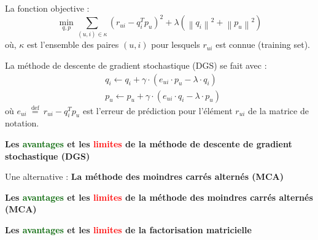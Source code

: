 \begin{frame}{\PartieI}
    La fonction objective :
    \begin{equation*}
        \min _{q, p} \sum_{(u, i) \in \kappa}\left(r_{u i}-q_i^T p_u\right)^2+\lambda\left(\left\|q_i\right\|^2+\left\|p_u\right\|^2\right)
    \end{equation*}
    où, $\kappa$ est l'ensemble des paires $(u,i)$ pour lesquels $r_{ui}$ est connue (training set).
\end{frame}

\begin{frame}{\PartieI}
    La méthode de descente de gradient stochastique (DGS) se fait avec :
    \begin{equation*}
        \begin{aligned}
             & q_i \leftarrow q_i+\gamma \cdot\left(e_{u i} \cdot p_u-\lambda \cdot q_i\right) \\
             & p_u \leftarrow p_u+\gamma \cdot\left(e_{u i} \cdot q_i-\lambda \cdot p_u\right)
        \end{aligned}
    \end{equation*}
    où $e_{u i}{\stackrel{\text { def }}{=}} r_{u i}-q_i^T p_u$ est l'erreur de prédiction pour l'élément $r_{ui}$ de la matrice de notation.
\end{frame}

\begin{frame}{\PartieI}
    \begin{center}
        \textbf{\large{Les \textcolor{darkgreen}{avantages} et les \textcolor{red}{limites} de la méthode de descente de gradient stochastique (DGS)}}
    \end{center}
\end{frame}

\begin{frame}{\PartieI}
    \begin{center}
        \large{Une alternative : \textbf{La méthode des moindres carrés alternés (MCA)}}
    \end{center}
\end{frame}

\begin{frame}{\PartieI}
    \begin{center}
        \textbf{\large{Les \textcolor{darkgreen}{avantages} et les \textcolor{red}{limites} de la méthode des moindres carrés alternés (MCA)}}
    \end{center}
\end{frame}

\begin{frame}{\PartieI}
    \begin{center}
        \textbf{\large{Les \textcolor{darkgreen}{avantages} et les \textcolor{red}{limites} de la factorisation matricielle}}
    \end{center}
\end{frame}